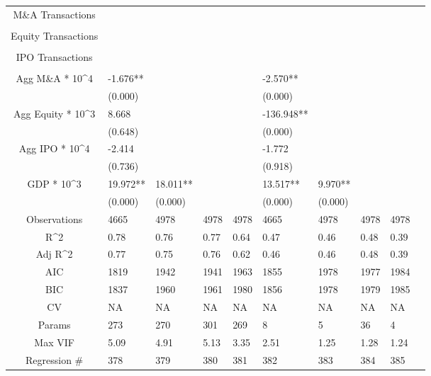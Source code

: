 \documentclass{article}
\begin{document}
\begin{table}[H]
\begin{tabular}{|clllllllll|}
  M\&A Transactions &  &  &  &  &  &  &  &  & \\
   &  &  &  &  &  &  &  &  & \\
  Equity Transactions &  &  &  &  &  &  &  &  & \\
   &  &  &  &  &  &  &  &  & \\
  IPO Transactions &  &  &  &  &  &  &  &  & \\
   &  &  &  &  &  &  &  &  & \\
  Agg M\&A * 10^4 & -1.676** &  &  &  & -2.570** &  &  &  & \\
   & (0.000) &  &  &  & (0.000) &  &  &  & \\
  Agg Equity * 10^3 & 8.668 &  &  &  & -136.948** &  &  &  & \\
   & (0.648) &  &  &  & (0.000) &  &  &  & \\
  Agg IPO * 10^4 & -2.414 &  &  &  & -1.772 &  &  &  & \\
   & (0.736) &  &  &  & (0.918) &  &  &  & \\
  GDP * 10^3 & 19.972** & 18.011** &  &  & 13.517** & 9.970** &  &  & \\
   & (0.000) & (0.000) &  &  & (0.000) & (0.000) &  &  & \\
  \hline
 Observations & 4665 & 4978 & 4978 & 4978 & 4665 & 4978 & 4978 & 4978 & \\
  R^2 & 0.78 & 0.76 & 0.77 & 0.64 & 0.47 & 0.46 & 0.48 & 0.39 & \\
  Adj R^2 & 0.77 & 0.75 & 0.76 & 0.62 & 0.46 & 0.46 & 0.48 & 0.39 & \\
  AIC & 1819 & 1942 & 1941 & 1963 & 1855 & 1978 & 1977 & 1984 & \\
  BIC & 1837 & 1960 & 1961 & 1980 & 1856 & 1978 & 1979 & 1985 & \\
  CV & NA & NA & NA & NA & NA & NA & NA & NA & \\
  Params & 273 & 270 & 301 & 269 & 8 & 5 & 36 & 4 & \\
  Max VIF & 5.09 & 4.91 & 5.13 & 3.35 & 2.51 & 1.25 & 1.28 & 1.24 & \\
  Regression \# & 378 & 379 & 380 & 381 & 382 & 383 & 384 & 385 & \\
   \hline
\end{tabular}

\end{table}
\end{document}
